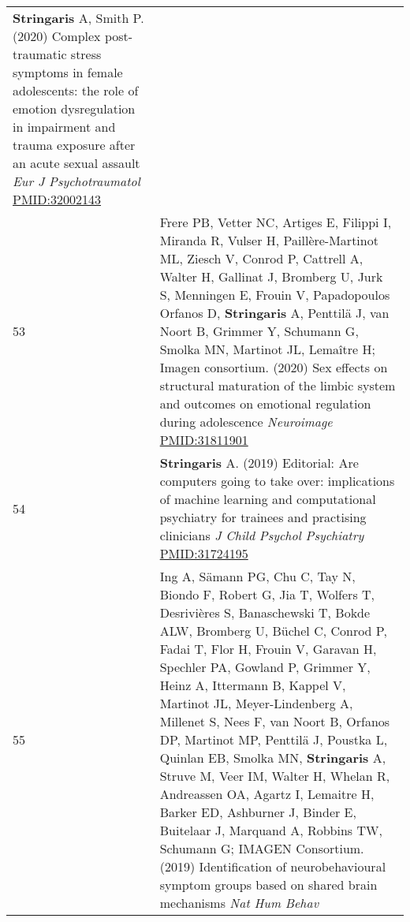 \documentclass[
]{article}
\begin{document}
\begin{longtable}[]{@{}ll@{}}
\begin{minipage}[t]{0.94\columnwidth}
\textbf{Stringaris} A, Smith P. (2020) Complex post-traumatic stress
symptoms in female adolescents: the role of emotion dysregulation in
impairment and trauma exposure after an acute sexual assault \emph{Eur J
Psychotraumatol} \url{PMID:32002143}\strut
\end{minipage}\tabularnewline
\begin{minipage}[t]{0.01\columnwidth}\raggedright
53\strut
\end{minipage} & \begin{minipage}[t]{0.94\columnwidth}\raggedright
Frere PB, Vetter NC, Artiges E, Filippi I, Miranda R, Vulser H,
Paillère-Martinot ML, Ziesch V, Conrod P, Cattrell A, Walter H, Gallinat
J, Bromberg U, Jurk S, Menningen E, Frouin V, Papadopoulos Orfanos D,
\textbf{Stringaris} A, Penttilä J, van Noort B, Grimmer Y, Schumann G,
Smolka MN, Martinot JL, Lemaître H; Imagen consortium. (2020) Sex
effects on structural maturation of the limbic system and outcomes on
emotional regulation during adolescence \emph{Neuroimage}
\url{PMID:31811901}\strut
\end{minipage}\tabularnewline
\begin{minipage}[t]{0.01\columnwidth}\raggedright
54\strut
\end{minipage} & \begin{minipage}[t]{0.94\columnwidth}\raggedright
\textbf{Stringaris} A. (2019) Editorial: Are computers going to take
over: implications of machine learning and computational psychiatry for
trainees and practising clinicians \emph{J Child Psychol Psychiatry}
\url{PMID:31724195}\strut
\end{minipage}\tabularnewline
\begin{minipage}[t]{0.01\columnwidth}\raggedright
55\strut
\end{minipage} & \begin{minipage}[t]{0.94\columnwidth}\raggedright
Ing A, Sämann PG, Chu C, Tay N, Biondo F, Robert G, Jia T, Wolfers T,
Desrivières S, Banaschewski T, Bokde ALW, Bromberg U, Büchel C, Conrod
P, Fadai T, Flor H, Frouin V, Garavan H, Spechler PA, Gowland P, Grimmer
Y, Heinz A, Ittermann B, Kappel V, Martinot JL, Meyer-Lindenberg A,
Millenet S, Nees F, van Noort B, Orfanos DP, Martinot MP, Penttilä J,
Poustka L, Quinlan EB, Smolka MN, \textbf{Stringaris} A, Struve M, Veer
IM, Walter H, Whelan R, Andreassen OA, Agartz I, Lemaitre H, Barker ED,
Ashburner J, Binder E, Buitelaar J, Marquand A, Robbins TW, Schumann G;
IMAGEN Consortium. (2019) Identification of neurobehavioural symptom
groups based on shared brain mechanisms \emph{Nat Hum Behav}

\end{minipage}
\end{longtable}
\end{document}
